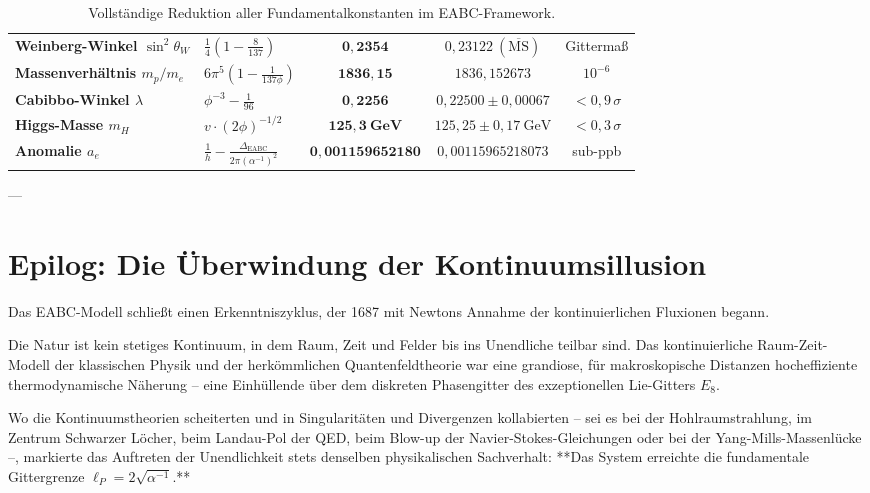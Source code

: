 \documentclass[11pt,a4paper]{article}
\theoremstyle{definition}
\theoremstyle{remark}
\numberwithin{equation}{section}
\begin{document}
\begin{table}[h!]
\begin{tabular}{llccc}
\textbf{Weinberg-Winkel $\sin^2\theta_W$} & $\frac{1}{4}\left(1 - \frac{8}{137}\right)$ & $\mathbf{0{,}2354}$ & $0{,}23122\ (\overline{\mathrm{MS}})$ & Gittermaß \\
\textbf{Massenverhältnis $m_p/m_e$} & $6\pi^5\left(1 - \frac{1}{137\phi}\right)$ & $\mathbf{1836{,}15}$ & $1836{,}152673$ & $10^{-6}$ \\
\textbf{Cabibbo-Winkel $\lambda$} & $\phi^{-3} - \frac{1}{96}$ & $\mathbf{0{,}2256}$ & $0{,}22500 \pm 0{,}00067$ & $< 0{,}9\,\sigma$ \\
\textbf{Higgs-Masse $m_H$} & $v \cdot (2\phi)^{-1/2}$ & $\mathbf{125{,}3\ \text{GeV}}$ & $125{,}25 \pm 0{,}17\ \text{GeV}$ & $< 0{,}3\,\sigma$ \\
\textbf{Anomalie $a_e$} & $\frac{1}{h} - \frac{\Delta_{\mathrm{EABC}}}{2\pi(\alpha^{-1})^2}$ & $\mathbf{0{,}001159652180}$ & $0{,}00115965218073$ & sub-ppb \\
\bottomrule
\end{tabular}
\caption{Vollständige Reduktion aller Fundamentalkonstanten im EABC-Framework.}
\label{tab:master_table}
\end{table}

---

\section{Epilog: Die Überwindung der Kontinuumsillusion}

Das EABC-Modell schließt einen Erkenntniszyklus, der 1687 mit Newtons Annahme der kontinuierlichen Fluxionen begann. 

Die Natur ist kein stetiges Kontinuum, in dem Raum, Zeit und Felder bis ins Unendliche teilbar sind. Das kontinuierliche Raum-Zeit-Modell der klassischen Physik und der herkömmlichen Quantenfeldtheorie war eine grandiose, für makroskopische Distanzen hocheffiziente thermodynamische Näherung – eine Einhüllende über dem diskreten Phasengitter des exzeptionellen Lie-Gitters $E_8$.

Wo die Kontinuumstheorien scheiterten und in Singularitäten und Divergenzen kollabierten – sei es bei der Hohlraumstrahlung, im Zentrum Schwarzer Löcher, beim Landau-Pol der QED, beim Blow-up der Navier-Stokes-Gleichungen oder bei der Yang-Mills-Massenlücke –, markierte das Auftreten der Unendlichkeit stets denselben physikalischen Sachverhalt: **Das System erreichte die fundamentale Gittergrenze $\ell_P = 2\sqrt{\alpha^{-1}}$.**
\end{document}
